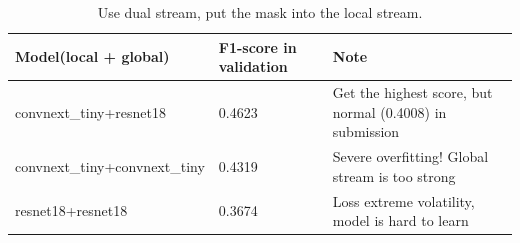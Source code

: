 \documentclass[11pt]{article}
\begin{document}
\begin{table}[H]
    \centering
    \setlength{\tabcolsep}{3pt}
    \caption{Use dual stream, put the mask into the local stream.}
    \begin{tabularx}{\linewidth}{lYY}
        \toprule
        Model(local + global)         & F1-score in validation & Note                                                     \\
        \midrule
        convnext\_tiny+resnet18       & 0.4623                 & Get the highest score, but normal (0.4008) in submission \\
        convnext\_tiny+convnext\_tiny & 0.4319                 & Severe overfitting! Global stream is too strong          \\
        resnet18+resnet18             & 0.3674                 & Loss extreme  volatility, model is hard to learn         \\

        \bottomrule
    \end{tabularx}
\end{table}
\end{document}
